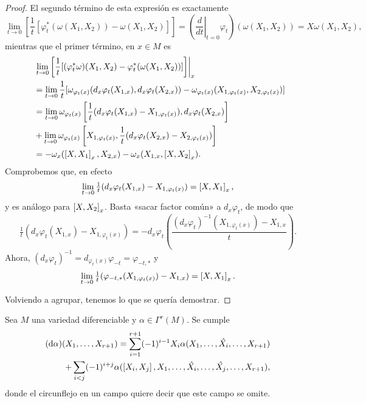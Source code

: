\begin{proof}
  El segundo término de esta expresión es exactamente
  \begin{equation*}
    \lim_{t\rightarrow 0}\left[\frac{1}{t}[\varphi_t^*(\omega(X_1,X_2))-\omega(X_1,X_2)]\right]=\left( \left. \frac{d}{dt}\right|_{t=0} \varphi_t \right)(\omega(X_1,X_2))=X\omega(X_1,X_2),
  \end{equation*}
  mientras que el primer término, en $x\in M$ es
  \begin{align*}
     & \left.\lim_{t\rightarrow 0}\left[\frac{1}{t}[(\varphi_t^* \omega)(X_1,X_2) - \varphi_t^*(\omega(X_1,X_2))]\right]\right|_{x}  \\
     & = \lim_{t \rightarrow 0}\frac{1}{t}[\omega_{\varphi_t(x)}(d_x \varphi_t(X_{1,x}),d_x \varphi_t(X_{2,x})) -\omega_{\varphi_t(x)}(X_{1,\varphi_t(x)},X_{2,\varphi_t(x)})] \\
     & = \lim_{t\rightarrow 0} \omega_{\varphi_t(x)}\left[\frac{1}{t}(d_x \varphi_t(X_{1,x})-X_{1,\varphi_t(x)}),d_x\varphi_t(X_{2,x})\right] \\\ &+ \lim_{t\rightarrow 0} \omega_{\varphi_t(x)}\left[ X_{1,\varphi_t (x)}, \frac{1}{t}(d_x \varphi_t (X_{2,x})-X_{2,\varphi_t(x)}) \right] \\
     & = -\omega_x(\lie{X}{X_1}_x,X_{2,x})-\omega_x(X_{1,x},\lie{X}{X_2}_x).
  \end{align*}
  Comprobemos que, en efecto
  \begin{equation*}
    \lim_{t\rightarrow 0}\tfrac{1}{t}(d_x\varphi_t(X_{1,x})-X_{1,\varphi_t(x)})=\left[X,X_1\right]_x,
  \end{equation*}
  y es análogo para $\left[X,X_2\right]_x$.
  Basta «sacar factor común» a $d_x\varphi_t$, de modo que
  \begin{equation*}
    \tfrac{1}{t}(d_x\varphi_t(X_{1,x})-X_{1,\varphi_t(x)})=-d_x\varphi_t\left( \frac{\left( d_x\varphi_t \right)^{-1}\left( X_{1,\varphi_t(x)} \right)-X_{1,x}}{t} \right).
  \end{equation*}
  Ahora, $(d_x\varphi_t)^{-1}=d_{\varphi_t(x)}\varphi_{-t}=\varphi_{-t,*}$ y 
  \begin{equation*}
    \lim_{t\rightarrow 0} \tfrac{1}{t}(\varphi_{-t,*}(X_{1,\varphi_t(x)})-X_{1,x})=\left[X,X_1\right]_x.
  \end{equation*}

  Volviendo a agrupar, tenemos lo que se quería demostrar.
\end{proof}
\begin{prop}
  Sea $M$ una variedad diferenciable y $\alpha \in \Gamma^r(M)$. Se cumple
  \begin{align*}
    (\mathrm{d} \alpha)(X_1,\dots,X_{r+1})=\sum_{i=1}^{r+1}(-1)^{i-1}X_i \alpha (X_1,\dots,\hat{X_i},\dots,X_{r+1}) \\
    + \sum_{i<j}(-1)^{i+j}\alpha(\left[X_i,X_j\right],X_1,\dots,\hat{X_i},\dots,\hat{X_j},\dots,X_{r+1}),
  \end{align*}
  donde el circunflejo en un campo quiere decir que este campo se omite.
\end{prop}
